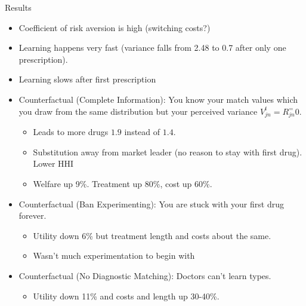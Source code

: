 \documentclass[xcolor=pdftex,dvipsnames,table,mathserif,aspectratio=169]{beamer}
\begin{document}
\begin{frame}{Results}
\begin{itemize}
\item Coefficient of risk aversion is high (switching costs?)
\item Learning happens very fast (variance falls from 2.48 to 0.7 after only \alert{one prescription}).
\item Learning slows after first prescription
\item Counterfactual (Complete Information): You know your match values which you draw from the same distribution but your perceived variance $V_{jn}^t = R_{jn}^=0$.
\begin{itemize}
\item Leads to more drugs $1.9$ instead of $1.4$.
\item Substitution away from market leader (no reason to stay with first drug). Lower HHI
\item Welfare up 9\%. Treatment up 80\%, cost up 60\%.
\end{itemize}
\item Counterfactual (Ban Experimenting): You are stuck with your first drug forever.
\begin{itemize}
\item Utility down 6\% but treatment length and costs about the same.
\item Wasn't much experimentation to begin with
\end{itemize}
\item Counterfactual (No Diagnostic Matching): Doctors can't learn types.
\begin{itemize}
\item Utility down 11\% and costs and length up 30-40\%.
\end{itemize}
\end{itemize}
\end{frame}






\end{document}
